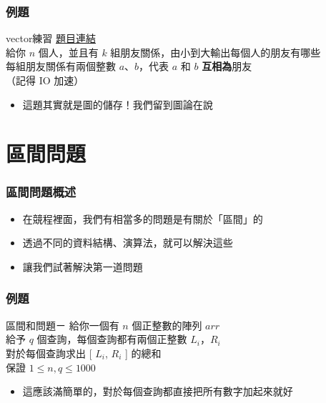 \documentclass{beamer}
\begin{document}
\begin{frame}
    \frametitle{例題}
    \begin{block}{vector練習}
        \href{https://toj.tfcis.org/oj/pro/575/}{題目連結}\\
        給你 $n$ 個人，並且有 $k$ 組朋友關係，由小到大輸出每個人的朋友有哪些\\
        每組朋友關係有兩個整數 $a$、$b$，代表 $a$ 和 $b$ \textbf{互相為}朋友\\
        （記得 IO 加速）
    \end{block}
    \begin{itemize}
        \item<2-> 這題其實就是圖的儲存！我們留到圖論在說
    \end{itemize}
\end{frame}

\section{區間問題}

\begin{frame}
    \frametitle{區間問題概述}
    \begin{itemize}
        \item 在競程裡面，我們有相當多的問題是有關於「區間」的
        \item 透過不同的資料結構、演算法，就可以解決這些
        \item 讓我們試著解決第一道問題
    \end{itemize}
\end{frame}

\begin{frame}
    \frametitle{例題}
    \begin{block}{區間和問題ㄧ}
        給你一個有 $n$ 個正整數的陣列 $arr$\\
        給予 $q$ 個查詢，每個查詢都有兩個正整數 $L_i$，$R_i$\\
        對於每個查詢求出 [ $L_i$, $R_i$ ] 的總和\\

        保證 $1 \leq n, q \leq 1000$
    \end{block}
    \begin{itemize}
        \item<2-> 這應該滿簡單的，對於每個查詢都直接把所有數字加起來就好
    \end{itemize}
\end{frame}
\end{document}
